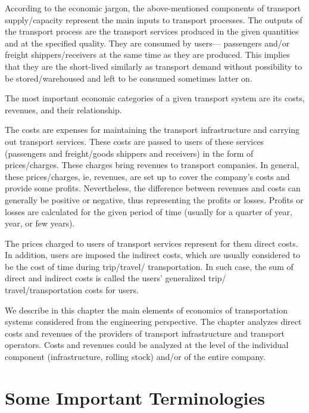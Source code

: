 \par
According to the economic jargon, the above-mentioned components of transport supply/capacity represent the main inputs to transport processes. The outputs of the transport process are the transport services produced in the given quantities and at the specified quality. They are consumed by users— passengers and/or freight shippers/receivers at the same time as they are produced. This implies that they are the short-lived similarly as transport demand without possibility to be stored/warehoused and left to be consumed sometimes latter on.\\
\par
The most important economic categories of a given transport system are its costs, revenues, and their relationship.\\
\par
The costs are expenses for maintaining the transport infrastructure and carrying out transport
services. These costs are passed to users of these services (passengers and freight/goods shippers and receivers) in the form of prices/charges. These charges bring revenues to transport companies. In general, these prices/charges, ie, revenues, are set up to cover the company’s costs and provide some profits. Nevertheless, the difference between revenues and costs can generally be positive or negative, thus representing the profits or losses. Profits or losses are calculated for the given period of time (usually for a quarter of year, year, or few years).\\
\par
The prices charged to users of transport services represent for them direct costs. In addition, users are imposed the indirect costs, which are usually considered to be the cost of time during trip/travel/ transportation. In such case, the sum of direct and indirect costs is called the users’ generalized trip/ travel/transportation costs for users.\\
\par
We describe in this chapter the main elements of economics of transportation systems considered
from the engineering perspective. The chapter analyzes direct costs and revenues of the providers of transport infrastructure and transport operators. Costs and revenues could be analyzed at the level of the individual component (infrastructure, rolling stock) and/or of the entire company.
\section{Some Important Terminologies}
